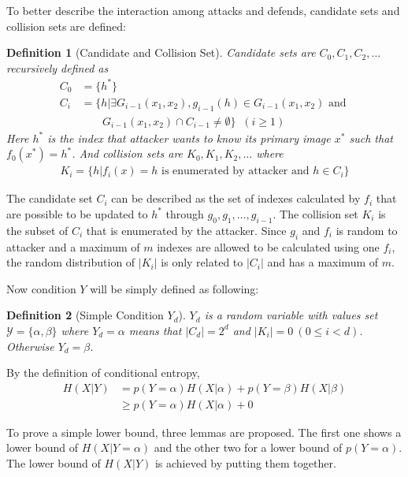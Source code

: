 \documentclass[10pt, conference, compsocconf]{IEEEtran}
\newtheorem{mydef}{Definition}
\begin{document}
		To better describe the interaction among attacks
		and defends, candidate sets and collision sets are defined:
		\begin{mydef}[Candidate and Collision Set]
			Candidate sets are $C_0, C_1, C_2, \ldots$ recursively defined as
			\begin{align*}
				C_0 &= \{h^*\}\\
				C_i &= \{h | \exists G_{i-1}(x_1, x_2),
					g_{i-1}(h) \in G_{i-1}(x_1, x_2) \text{ and } \\
					& \;\;\;\;\;\;\; G_{i-1}(x_1, x_2) \cap C_{i-1} \neq \emptyset \} \;\;(i \geq 1)
			\end{align*}
			Here $h^*$ is the index that attacker wants to know its primary image
			$x^*$ such that $f_0(x^*) = h^*$. And collision sets are $K_0, K_1, K_2, \ldots$ where
			\begin{align*}
				K_i = \{h | f_i(x) = h \text{ is enumerated by attacker and } h \in C_i \}
			\end{align*}
		\end{mydef}
		
		The candidate set $C_i$ can be described as the set of indexes 
		calculated by $f_i$ that are possible to be
		updated to $h^*$ through $g_0, g_1, \ldots, g_{i-1}$. The collision set $K_i$ is the
		subset of $C_i$ that is enumerated by the attacker. Since $g_i$ and $f_i$ is random
		to attacker and a maximum of $m$ indexes are allowed to be calculated using one $f_i$, 
		the random distribution of $|K_i|$ is only related to $|C_i|$ and has a maximum
		of $m$. 
		
		Now condition $Y$ will be simply defined as following:
		\begin{mydef}[Simple Condition $Y_d$]
			$Y_d$ is a random variable with values set
			$\mathcal Y = \{ \alpha, \beta \}$ where
			$Y_d = \alpha$ means that $|C_d| = 2^d$
			and $|K_i| = 0~(0 \leq i < d)$.
			Otherwise $Y_d = \beta$.
		\end{mydef}
		
		By the definition of conditional entropy,
		\begin{align*}
			H(X|Y) &= p(Y = \alpha) H(X | \alpha) + p(Y = \beta) H(X | \beta)\\
				&\geq p(Y = \alpha) H(X | \alpha) + 0
		\end{align*}
		
		To prove a simple lower bound, three lemmas are proposed.
		The first one shows a lower bound of $H(X | Y = \alpha)$
		and the other two for a lower bound of $p(Y = \alpha)$.
		The lower bound of $H(X | Y)$ is achieved by putting
		them together.
		
\end{document}
